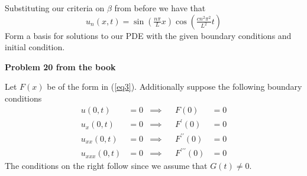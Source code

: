 \documentclass[12pt]{article}
\newcommand{\problem}[1]{\hspace{-4 ex} \large \textbf{Problem #1} }
\begin{document}
	Substituting our criteria on $\beta$ from before we have that
	$$
		u_n(x,t) = \sin(\tfrac{n\pi}{L}x) \cos(\tfrac{cn^2 \pi^2}{L^2}t)
	$$
	Form a basis for solutions to our PDE with the given boundary conditions and initial condition.
	
\problem{20 from the book}

	Let $F(x)$ be of the form in (\ref{eq3}). Additionally suppose the following boundary conditions
	\begin{align}
		u(0,t) &= 0 & \implies & & F(0) &= 0 \label{bc16}\\
		u_x(0,t) &= 0 & \implies & & F^\prime(0) &= 0 \label{bc17}\\
		u_{xx}(0,t) &= 0 & \implies & & F^{\prime\prime}(0) &= 0 \label{bc18}\\
		u_{xxx}(0,t) &= 0 & \implies & & F^{\prime\prime\prime}(0) &= 0 \label{bc19}
	\end{align}
	The conditions on the right follow since we assume that $G(t) \neq 0$.
	
\end{document}
